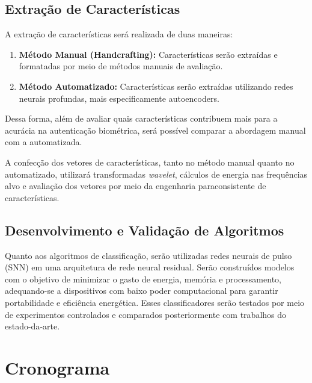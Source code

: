 		\subsection{Extração de Características}
		
			\par A extração de características será realizada de duas maneiras:
			
			\begin{enumerate}
				\item \textbf{Método Manual (Handcrafting):} Características serão extraídas e formatadas por meio de métodos manuais de avaliação.
				\item \textbf{Método Automatizado:} Características serão extraídas utilizando redes neurais profundas, mais especificamente autoencoders.
			\end{enumerate}
			
			\par Dessa forma, além de avaliar quais características contribuem mais para a acurácia na autenticação biométrica, será possível comparar a abordagem manual com a automatizada.
			
			\par A confecção dos vetores de características, tanto no método manual quanto no automatizado, utilizará transformadas \textit{wavelet}, cálculos de energia nas frequências alvo e avaliação dos vetores por meio da engenharia paraconsistente de características.
			
		\subsection{Desenvolvimento e Validação de Algoritmos}
		
			\par Quanto aos algoritmos de classificação, serão utilizadas redes neurais de pulso (SNN) em uma arquitetura de rede neural residual. Serão construídos modelos com o objetivo de minimizar o gasto de energia, memória e processamento, adequando-se a dispositivos com baixo poder computacional para garantir portabilidade e eficiência energética. Esses classificadores serão testados por meio de experimentos controlados e comparados posteriormente com trabalhos do estado-da-arte.
			
			\newpage
	
	\section{Cronograma}
	
